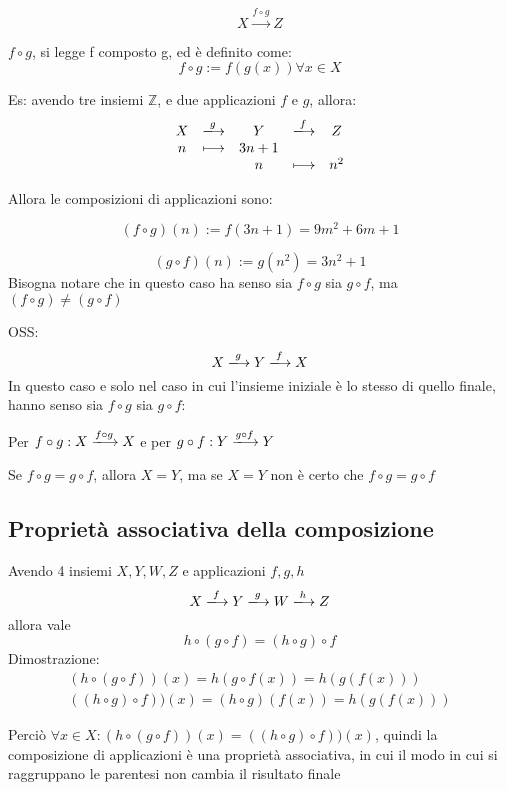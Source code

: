 \documentclass[a4paper,12pt]{article}
\begin{document}
	\[
	X \xrightarrow{f \circ g} Z
	\]
	
	$f \circ g$, si legge f composto g, ed è definito come:
	\[
	f \circ g := f(g(x)) \forall x\in X
	\]
	
	Es: avendo tre insiemi $\mathbb{Z}$, e due applicazioni $f$ e $g$, allora:
	\[
	\begin{array}{c c c c c}
		X & \xlongrightarrow{g} & Y & \xlongrightarrow{f} & Z \\
		n & \longmapsto & 3n+1 & & \\
		&& n & \longmapsto & n^2
	\end{array}
	\]
	
	Allora le composizioni di applicazioni sono:
	
	\[
	(f \circ g)(n) := f(3n + 1) = 9m^2 + 6m + 1
	\]	
	
	\[
	(g \circ f)(n) := g(n^2) = 3n^2 + 1
	\]
	Bisogna notare che in questo caso ha senso sia $f \circ g$ sia $g \circ f$, ma $(f \circ g) \not = (g \circ f)$
	
	
	OSS: 
	\[
	X \xlongrightarrow{g} Y \xlongrightarrow{f} X
	\]
	In questo caso e solo nel caso in cui l'insieme iniziale è lo stesso di quello finale, hanno senso sia $f \circ g$ sia $g \circ f$:
	\begin{center}
		Per $f \circ g : X \xlongrightarrow{f \circ g} X$ e per $g \circ f : Y \xlongrightarrow{g \circ f} Y$
	\end{center}
	Se $f \circ g = g \circ f$, allora $X = Y$, ma se $X = Y$ non è certo che $f \circ g = g \circ f$
	
	\subsection{Proprietà associativa della composizione}
	
	Avendo 4 insiemi $X, Y, W, Z$ e applicazioni $f, g, h$
	\[
	X \xlongrightarrow{f} Y \xlongrightarrow{g} W \xlongrightarrow{h} Z
	\]
	allora vale
	\[
	h \circ (g \circ f) = (h \circ g) \circ f
	\]
	Dimostrazione:
	\begin{align}
		(h \circ (g \circ f))(x) = h(g \circ f(x)) = h(g(f(x))) \\
		((h \circ g) \circ f))(x) = (h \circ g)(f(x)) = h(g(f(x)))
	\end{align}
	
	Perciò $\forall x \in X: (h \circ (g \circ f))(x) = ((h \circ g) \circ f))(x)$, quindi la composizione di applicazioni è una proprietà associativa, in cui il modo in cui si raggruppano le parentesi non cambia il risultato finale
	
\end{document}

